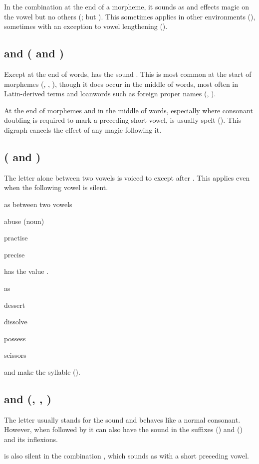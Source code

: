 In the combination  at the end of a morpheme, it sounds as  and
effects magic  on the vowel  but no others (; but
). This sometimes applies in other environments
(), sometimes with an exception to vowel lengthening
().

\subsection{ and  ( and )}

Except at the end of words,  has the sound . This is most common at
the start of morphemes (, , ), though it does occur
in the middle of words, most often in Latin-derived terms and loanwords such as
foreign proper names (, ).

At the end of morphemes and in the middle of words, especially where consonant
doubling is required to mark a preceding short vowel,  is usually spelt
 (). This digraph cancels the effect of any magic 
following it.

\subsection{ ( and )}

The letter  alone between two vowels is voiced to  except after
. This applies even when the following vowel is silent.

\begin{exceptions}{ as  between two vowels}
\item abuse (noun)
\item practise
\item precise
\end{exceptions}

 has the value .

\begin{exceptions}{ as }
\item dessert
\item dissolve
\item possess
\item scissors
\end{exceptions}

 and  make the syllable  ().

\subsection{ and  (, , )}

The letter  usually stands for the sound  and behaves like a normal
consonant. However, when followed by  it can also have the sound  in
the suffixes  () and  () and its inflexions.

 is also silent in the combination , which sounds as  with
a short preceding vowel.
